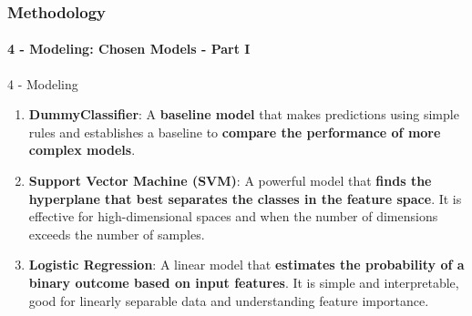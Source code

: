 \begin{frame}
	\frametitle{Methodology}
	\framesubtitle{4 - Modeling: Chosen Models - Part I}	
	
	\begin{block}{4 - Modeling} 
		\begin{enumerate}
			\item \textbf{DummyClassifier}: A \textbf{baseline model} that makes predictions using simple rules and establishes a baseline to \textbf{compare the performance of more complex models}.
			
			\item \textbf{Support Vector Machine (SVM)}: A powerful model that \textbf{finds the hyperplane that best separates the classes in the feature space}. It is  effective for high-dimensional spaces and when the number of dimensions exceeds the number of samples.
			
			\item \textbf{Logistic Regression}: A linear model that \textbf{estimates the probability of a binary outcome based on input features}. It is simple and interpretable, good for linearly separable data and understanding feature importance.
		\end{enumerate}
	\end{block}
\end{frame}







